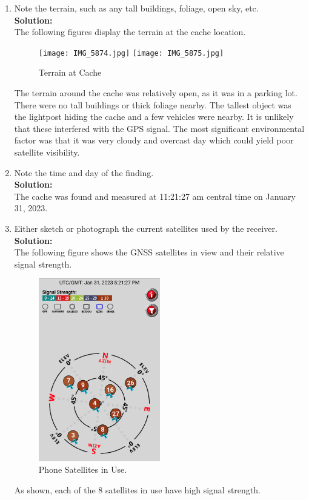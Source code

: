 \documentclass[11pt]{article}
\newcommand{\solution}{\textbf{\\Solution: \\}}
\begin{document}
\begin{enumerate}[label=\textbf{\arabic*.}]
  \item Note the terrain, such as any tall buildings, foliage, open sky, etc. 
  \solution
  The following figures display the terrain at the cache location.
  \begin{figure}[H]
    \centering
    \texttt{[image: IMG\_5874.jpg]}
    \texttt{[image: IMG\_5875.jpg]}
    \caption{Terrain at Cache}
  \end{figure}
  The terrain around the cache was relatively open, as it was in a parking 
  lot. There were no tall buildings or thick foliage nearby. The tallest 
  object was the lightpost hiding the cache and a few vehicles were
  nearby. It is unlikely that these interfered with the GPS signal. The 
  most significant environmental factor was that it was very cloudy and 
  overcast day which could yield poor satellite visibility.

  \item  Note the time and day of the finding. 
  \solution
  The cache was found and measured at 11:21:27 am central time 
  on January 31, 2023.

  \item Either sketch or photograph the current satellites used by the 
  receiver.
  \solution
  The following figure shows the GNSS satellites in view and their relative 
  signal strength.
  \begin{figure}[H]
    \centering
    \includegraphics[width=0.5\textwidth]{p4.png}
    \caption{Phone Satellites in Use.}
  \end{figure}
  As shown, each of the 8 satellites in use have high signal strength.


\end{enumerate}
\end{document}
